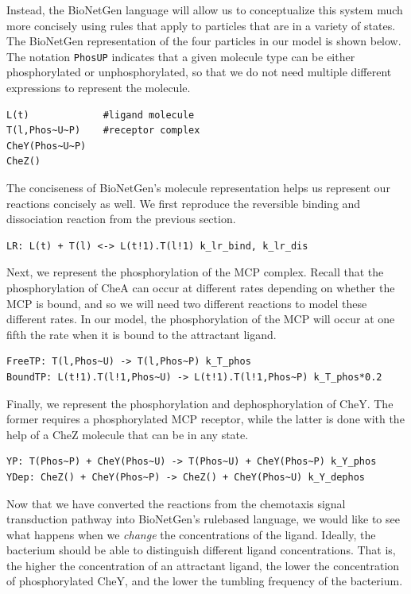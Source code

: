 Instead, the BioNetGen language will allow us to conceptualize this system much more concisely using rules that apply to particles that are in a variety of states. The BioNetGen representation of the four particles in our model is shown below. The notation \texttt{Phos\texttildelow U\texttildelow P} indicates that a given molecule type can be either phosphorylated or unphosphorylated, so that we do not need multiple different expressions to represent the molecule.

\begin{verbatim}
L(t)             #ligand molecule
T(l,Phos~U~P)    #receptor complex
CheY(Phos~U~P) 
CheZ()
\end{verbatim}

The conciseness of BioNetGen's molecule representation helps us represent our reactions concisely as well. We first reproduce the reversible binding and dissociation reaction from the previous section.

\begin{verbatim}
LR: L(t) + T(l) <-> L(t!1).T(l!1) k_lr_bind, k_lr_dis
\end{verbatim}

Next, we represent the phosphorylation of the MCP complex. Recall that the phosphorylation of CheA can occur at different rates depending on whether the MCP is bound, and so we will need two different reactions to model these different rates. In our model, the phosphorylation of the MCP will occur at one fifth the rate when it is bound to the attractant ligand.

\begin{verbatim}
FreeTP: T(l,Phos~U) -> T(l,Phos~P) k_T_phos   
BoundTP: L(t!1).T(l!1,Phos~U) -> L(t!1).T(l!1,Phos~P) k_T_phos*0.2
\end{verbatim}

Finally, we represent the phosphorylation and dephosphorylation of CheY. The former requires a phosphorylated MCP receptor, while the latter is done with the help of a CheZ molecule that can be in any state.

\begin{verbatim}
YP: T(Phos~P) + CheY(Phos~U) -> T(Phos~U) + CheY(Phos~P) k_Y_phos
YDep: CheZ() + CheY(Phos~P) -> CheZ() + CheY(Phos~U) k_Y_dephos
\end{verbatim}

Now that we have converted the reactions from the chemotaxis signal transduction pathway into BioNetGen's rule\-based language, we would like to see what happens when we \textit{change} the concentrations of the ligand. Ideally, the bacterium should be able to distinguish different ligand concentrations. That is, the higher the concentration of an attractant ligand, the lower the concentration of phosphorylated CheY, and the lower the tumbling frequency of the bacterium.

